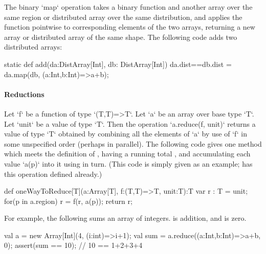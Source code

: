 The binary \xcd`map` operation takes a binary function and
another
array over the same region or distributed array over the same  distribution,
and applies the function 
pointwise to corresponding elements of the two arrays, returning
a new array or distributed array of the same shape.
The following code adds two distributed arrays: 
\begin{xten}
static def add(da:DistArray[Int], db: DistArray[Int])
    {da.dist==db.dist}
    = da.map(db, (a:Int,b:Int)=>a+b);
\end{xten}



\paragraph{Reductions}\label{ArrayReductions}

Let \xcd`f` be a function of type \xcd`(T,T)=>T`.  Let
\xcd`a` be an array over base type \xcd`T`.
Let \xcd`unit` be a value of type \xcd`T`.
Then the
operation \xcd`a.reduce(f, unit)` returns a value of type \xcd`T` obtained
by combining all the elements of \xcd`a` by use of  \xcd`f` in some unspecified order
(perhaps in parallel).   
The following code gives one method which 
meets the definition of ,
having a running total , and accumulating each value \xcd`a(p)` into it
using  in turn.  (This code is simply given as an example; 
has this operation defined already.)
\begin{xten}
def oneWayToReduce[T](a:Array[T], f:(T,T)=>T, unit:T):T {
  var r : T = unit;
  for(p in a.region) r = f(r, a(p));
  return r;
}
\end{xten}


For example,  the following sums an array of integers.   is addition,
and  is zero.  
\begin{xten}
val a = new Array[Int](4, (i:int)=>i+1);
val sum = a.reduce((a:Int,b:Int)=>a+b, 0); 
assert(sum == 10); // 10 == 1+2+3+4
\end{xten}

